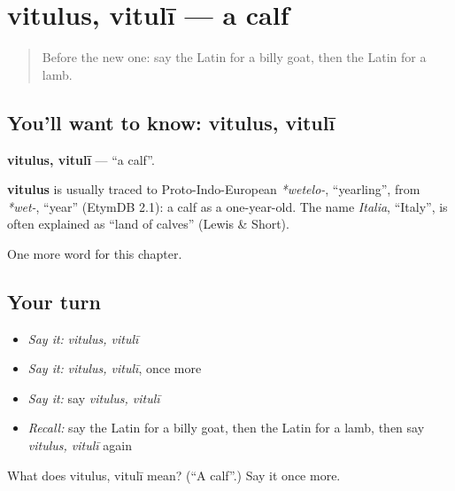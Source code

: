 \section[vitulus, vitulī]{vitulus, vitulī — a calf}

\label{lesson:LA-C224-vitulus}



\begin{quote}
Before the new one: say the Latin for a billy goat, then the Latin for a lamb.
\end{quote}

\subsection*{You'll want to know: vitulus, vitulī}
\textbf{vitulus, vitulī} — \textquotedblleft{}a calf\textquotedblright{}.

\begin{cousinweb}
\textbf{vitulus} is usually traced to Proto-Indo-European \emph{*wetelo-}, \textquotedblleft{}yearling\textquotedblright{}, from \emph{*wet-}, \textquotedblleft{}year\textquotedblright{} (EtymDB 2.1): a calf as a one-year-old. The name \emph{Italia}, \textquotedblleft{}Italy\textquotedblright{}, is often explained as \textquotedblleft{}land of calves\textquotedblright{} (Lewis \& Short).
\end{cousinweb}

\begin{grammarlens}[title={What you've built}]
One more word for this chapter.
\end{grammarlens}

\subsection*{Your turn}
\begin{itemize}
\raggedright
  \item \emph{Say it:} \emph{vitulus, vitulī}
  \item \emph{Say it:} \emph{vitulus, vitulī}, once more
  \item \emph{Say it:} say \emph{vitulus, vitulī}
  \item \emph{Recall:} say the Latin for a billy goat, then the Latin for a lamb, then say \emph{vitulus, vitulī} again
\end{itemize}

\begin{tcolorbox}[breakable,colback=teal!4,colframe=teal!35!black,title={Before you move on}]
What does vitulus, vitulī mean? (\textquotedblleft{}A calf\textquotedblright{}.) Say it once more.
\end{tcolorbox}
